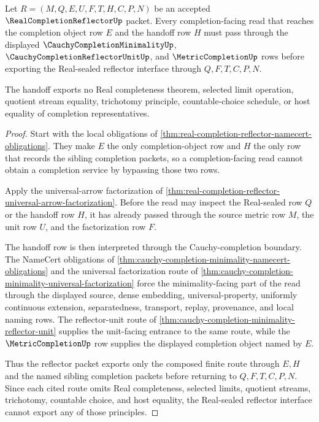 \begin{theorem}
\label{thm:real-completion-reflector-minimality-handoff}
Let $R=(M,Q,E,U,F,T,H,C,P,N)$ be an accepted $\RealCompletionReflectorUp$ packet. Every completion-facing read that reaches the completion object row $E$ and the handoff row $H$ must pass through the displayed $\CauchyCompletionMinimalityUp$, $\CauchyCompletionReflectorUnitUp$, and $\MetricCompletionUp$ rows before exporting the Real-sealed reflector interface through $Q,F,T,C,P,N$.

The handoff exports no Real completeness theorem, selected limit operation, quotient stream equality, trichotomy principle, countable-choice schedule, or host equality of completion representatives.
\end{theorem}
\begin{proof}
Start with the local obligations of \autoref{thm:real-completion-reflector-namecert-obligations}. They make $E$ the only completion-object row and $H$ the only row that records the sibling completion packets, so a completion-facing read cannot obtain a completion service by bypassing those two rows.

Apply the universal-arrow factorization of \autoref{thm:real-completion-reflector-universal-arrow-factorization}. Before the read may inspect the Real-sealed row $Q$ or the handoff row $H$, it has already passed through the source metric row $M$, the unit row $U$, and the factorization row $F$.

The handoff row is then interpreted through the Cauchy-completion boundary. The NameCert obligations of \autoref{thm:cauchy-completion-minimality-namecert-obligations} and the universal factorization route of \autoref{thm:cauchy-completion-minimality-universal-factorization} force the minimality-facing part of the read through the displayed source, dense embedding, universal-property, uniformly continuous extension, separatedness, transport, replay, provenance, and local naming rows. The reflector-unit route of \autoref{thm:cauchy-completion-minimality-reflector-unit} supplies the unit-facing entrance to the same route, while the $\MetricCompletionUp$ row supplies the displayed completion object named by $E$.

Thus the reflector packet exports only the composed finite route through $E,H$ and the named sibling completion packets before returning to $Q,F,T,C,P,N$. Since each cited route omits Real completeness, selected limits, quotient streams, trichotomy, countable choice, and host equality, the Real-sealed reflector interface cannot export any of those principles.
\end{proof}

